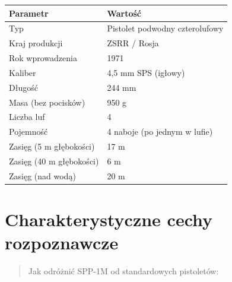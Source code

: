 \documentclass[12pt,openany,oneside]{book}
\begin{document}
\begin{longtable}[]{@{}ll@{}}
\toprule\noalign{}
Parametr & Wartość \\
\midrule\noalign{}
\endhead
\bottomrule\noalign{}
\endlastfoot
Typ & Pistolet podwodny czterolufowy \\
Kraj produkcji & ZSRR / Rosja \\
Rok wprowadzenia & 1971 \\
Kaliber & 4,5 mm SPS (igłowy) \\
Długość & 244 mm \\
Masa (bez pocisków) & 950 g \\
Liczba luf & 4 \\
Pojemność & 4 naboje (po jednym w lufie) \\
Zasięg (5 m głębokości) & 17 m \\
Zasięg (40 m głębokości) & 6 m \\
Zasięg (nad wodą) & 20 m \\
\end{longtable}

\section{Charakterystyczne cechy
rozpoznawcze}\label{charakterystyczne-cechy-rozpoznawcze-99}

\begin{quote}
Jak odróżnić SPP-1M od standardowych pistoletów:
\end{quote}
\end{document}
